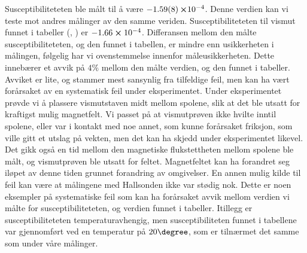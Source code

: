 \documentclass[%
 reprint,
nofootinbib,
aps,
]{revtex4-1}
\begin{document}
Susceptibiliteteten ble målt til å være $-\SI{1.59\pm0.08}\cross 10^{-4}$. Denne verdien kan vi teste mot andres målinger av den samme veriden. Susceptibiliteteten til vismut funnet i tabeller (\cite{noauthor_magnetic_nodate}, \cite{noauthor_magnetic_2018}) er $-1.66\cross 10^{-4}$. Differansen mellom den målte susceptibiliteteten, og den funnet i tabellen, er mindre enn usikkerheten i målingen, følgelig har vi ovenstemmelse innenfor måleusikkerheten. Dette innebærer et avvik på $4\%$ mellom den målte verdien, og den funnet i tabeller. Avviket er lite, og stammer mest sansynlig fra tilfeldige feil, men kan ha vært forårsaket av en systematisk feil under eksperimentet. Under eksperimentet prøvde vi å plassere vismutstaven midt mellom spolene, slik at det ble utsatt for kraftigst mulig magnetfelt. Vi passet på at vismutprøven ikke hvilte inntil spolene, eller var i kontakt med noe annet, som kunne forårsaket friksjon, som ville gitt et utslag på vekten, men det kan ha skjedd under eksperimentet likevel. Det gikk også en tid mellom den magnetiske flukstettheten mellom spolene ble målt, og vismutprøven ble utsatt for feltet. Magnetfeltet kan ha forandret seg iløpet av denne tiden grunnet forandring av omgivelser. En annen mulig kilde til feil kan være at målingene med Hallsonden ikke var stødig nok. Dette er noen eksempler på systematiske feil som kan ha forårsaket avvik mellom verdien vi målte for susceptibiliteteten, og verdien funnet i tabeller. Itillegg er susceptibiliteteten temperaturavhengig, men susceptibiliteten funnet i tabellene var gjennomført ved en temperatur på
$20\degree$, som er tilnærmet det samme som under våre målinger.
\end{document}
